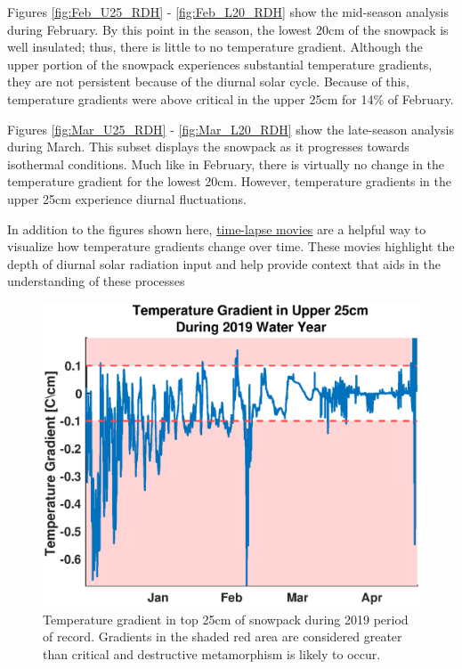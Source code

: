 Figures  \ref{fig:Feb_U25_RDH} - \ref{fig:Feb_L20_RDH} show the mid-season analysis during February. By this point in the season, the lowest 20cm of the snowpack is well insulated; thus, there is little to no temperature gradient. Although the upper portion of the snowpack experiences substantial temperature gradients, they are not persistent because of the diurnal solar cycle. Because of this, temperature gradients were above critical in the upper 25cm for 14\% of February. 

Figures \ref{fig:Mar_U25_RDH} - \ref{fig:Mar_L20_RDH} show the late-season analysis during March. This subset displays the snowpack as it progresses towards isothermal conditions.  Much like in February, there is virtually no change in the temperature gradient for the lowest 20cm. However, temperature gradients in the upper 25cm experience diurnal fluctuations.

In addition to the figures shown here, \href{https://www.youtube.com/playlist?list=PLN7P9tpWCRZofzf19t5gqyeo645Kbmsac}{time-lapse movies} are a helpful way to visualize how temperature gradients change over time. These movies highlight the depth of diurnal solar radiation input and help provide context that aids in the understanding of these processes

 \begin{figure}[H]
    \centering
    \includegraphics[width=0.65\linewidth]{figures/TempGrad/WY2019_U25_Grad.eps}
    \caption{Temperature gradient in top 25cm of snowpack during 2019 period of record. Gradients in the shaded red area are considered greater than critical and destructive metamorphism is likely to occur.}
    \label{fig:WY2019_U25_Grad}
 \end{figure}


